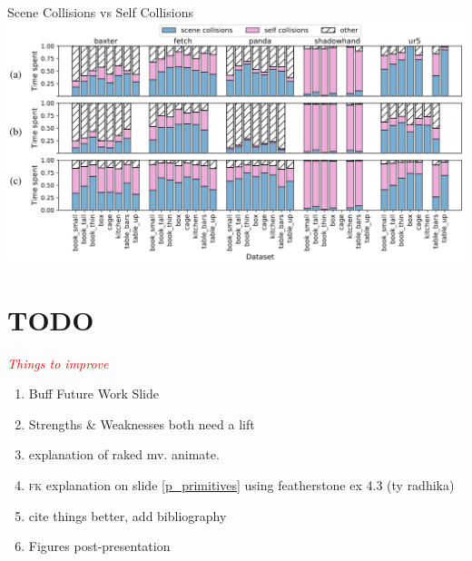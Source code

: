 \documentclass{beamer}
\newcommand{\todo}[1]{\textit{\textcolor{red}{#1}}}
\begin{document}
\begin{frame}{Scene Collisions vs Self Collisions}
\includegraphics[width=\textwidth]{./assets/sc_sc_zoom.png}
\end{frame}

\section {TODO}

\begin{frame}{\todo{Things to improve}}
\begin{enumerate}
\item Buff Future Work Slide
\item Strengths \& Weaknesses both need a lift
\item explanation of raked mv. animate.
\item \textsc{fk} explanation on slide \ref{p_primitives} using featherstone ex 4.3 (ty radhika)
\item cite things better, add bibliography
\item Figures post-presentation
\end{enumerate}
\end{frame}
\end{document}
